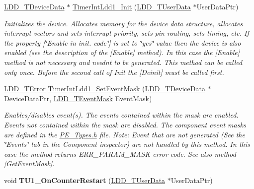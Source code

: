 \begin{DoxyCompactItemize}
\item 
\hyperlink{group___p_e___types__module_gac5cf1362f1f0e3a2ce71b1bf2276d091}{L\+D\+D\+\_\+\+T\+Device\+Data} $\ast$ \hyperlink{group___timer_int_ldd1__module_ga069f7459fc74e21fb9bcceadbe7cb9cb}{Timer\+Int\+Ldd1\+\_\+\+Init} (\hyperlink{group___p_e___types__module_ga0b66a73f87238a782318aa0be7578e35}{L\+D\+D\+\_\+\+T\+User\+Data} $\ast$User\+Data\+Ptr)
\begin{DoxyCompactList}\small\item\em Initializes the device. Allocates memory for the device data structure, allocates interrupt vectors and sets interrupt priority, sets pin routing, sets timing, etc. If the property \mbox{[}\char`\"{}\+Enable in init. code\char`\"{}\mbox{]} is set to \char`\"{}yes\char`\"{} value then the device is also enabled (see the description of the \mbox{[}Enable\mbox{]} method). In this case the \mbox{[}Enable\mbox{]} method is not necessary and needn\textquotesingle{}t to be generated. This method can be called only once. Before the second call of Init the \mbox{[}Deinit\mbox{]} must be called first. \end{DoxyCompactList}\item 
\hyperlink{group___p_e___types__module_ga24c2b045fd04e79e85f261ce4df35588}{L\+D\+D\+\_\+\+T\+Error} \hyperlink{group___timer_int_ldd1__module_gaf99e15010d993ffdbc1d2eb08d4d229d}{Timer\+Int\+Ldd1\+\_\+\+Set\+Event\+Mask} (\hyperlink{group___p_e___types__module_gac5cf1362f1f0e3a2ce71b1bf2276d091}{L\+D\+D\+\_\+\+T\+Device\+Data} $\ast$Device\+Data\+Ptr, \hyperlink{group___p_e___types__module_gafbe7f4d4e51560399c3bdd0218584533}{L\+D\+D\+\_\+\+T\+Event\+Mask} Event\+Mask)
\begin{DoxyCompactList}\small\item\em Enables/disables event(s). The events contained within the mask are enabled. Events not contained within the mask are disabled. The component event masks are defined in the \hyperlink{_p_e___types_8h}{P\+E\+\_\+\+Types.\+h} file. Note\+: Event that are not generated (See the \char`\"{}\+Events\char`\"{} tab in the Component inspector) are not handled by this method. In this case the method returns E\+R\+R\+\_\+\+P\+A\+R\+A\+M\+\_\+\+M\+A\+SK error code. See also method \mbox{[}Get\+Event\+Mask\mbox{]}. \end{DoxyCompactList}\item 
\mbox{\label{group___timer_int_ldd1__module_ga915c714e97fd2a66385fddc37d45352a}} 
void {\bfseries T\+U1\+\_\+\+On\+Counter\+Restart} (\hyperlink{group___p_e___types__module_ga0b66a73f87238a782318aa0be7578e35}{L\+D\+D\+\_\+\+T\+User\+Data} $\ast$User\+Data\+Ptr)
\end{DoxyCompactItemize}


